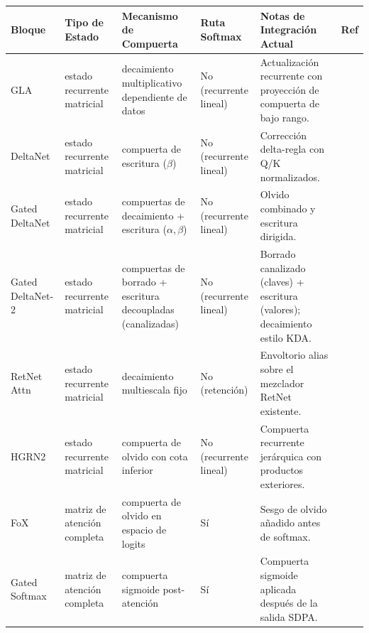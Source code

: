 \documentclass[11pt,a4paper]{article}
\begin{document}
\small
\begin{longtable}{p{2.4cm}p{2.0cm}p{2.2cm}p{1.8cm}p{4.0cm}p{1.5cm}}
\toprule
\textbf{Bloque} & \textbf{Tipo de Estado} & \textbf{Mecanismo de Compuerta} & \textbf{Ruta Softmax} & \textbf{Notas de Integración Actual} & \textbf{Ref} \\
\midrule
\endhead
GLA & estado recurrente matricial & decaimiento multiplicativo dependiente de datos & No (recurrente lineal) & Actualización recurrente con proyección de compuerta de bajo rango. & \citep{yang_gla_2023} \\
DeltaNet & estado recurrente matricial & compuerta de escritura ($\beta$) & No (recurrente lineal) & Corrección delta-regla con Q/K normalizados. & \citep{yang_deltanet_2024} \\
Gated DeltaNet & estado recurrente matricial & compuertas de decaimiento + escritura ($\alpha,\beta$) & No (recurrente lineal) & Olvido combinado y escritura dirigida. & \citep{yang_gated_deltanet_2024} \\
Gated DeltaNet-2 & estado recurrente matricial & compuertas de borrado + escritura decoupladas (canalizadas) & No (recurrente lineal) & Borrado canalizado (claves) + escritura (valores); decaimiento estilo KDA. & \citep{hatamizadeh_gated_deltanet2_2026} \\
RetNet Attn & estado recurrente matricial & decaimiento multiescala fijo & No (retención) & Envoltorio alias sobre el mezclador RetNet existente. & \citep{sun_retentive_2023} \\
HGRN2 & estado recurrente matricial & compuerta de olvido con cota inferior & No (recurrente lineal) & Compuerta recurrente jerárquica con productos exteriores. & \citep{qin_hgrn2_2024} \\
FoX & matriz de atención completa & compuerta de olvido en espacio de logits & Sí & Sesgo de olvido añadido antes de softmax. & \citep{lin_forgetting_transformer_2025} \\
Gated Softmax & matriz de atención completa & compuerta sigmoide post-atención & Sí & Compuerta sigmoide aplicada después de la salida SDPA. & \citep{qiu_gated_attention_2025} \\
\bottomrule
\end{longtable}
\normalsize
\end{document}
